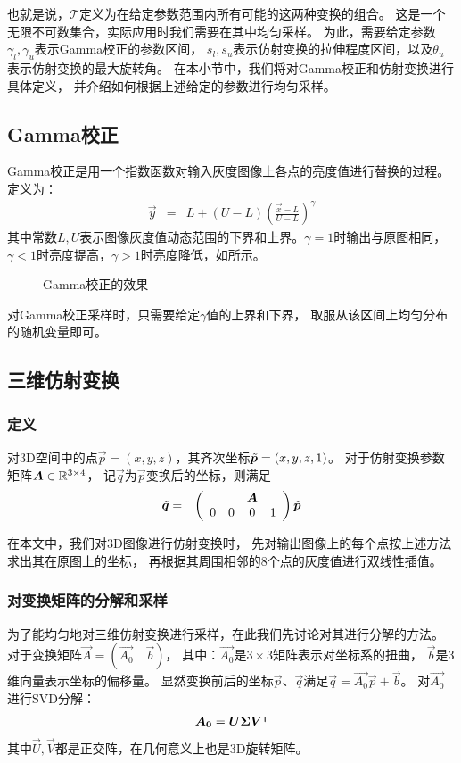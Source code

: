 也就是说，$\mathcal{T}$定义为在给定参数范围内所有可能的这两种变换的组合。
这是一个无限不可数集合，实际应用时我们需要在其中均匀采样。
为此，需要给定参数$\gamma_l, \gamma_u$表示Gamma校正的参数区间，
$s_l, s_u$表示仿射变换的拉伸程度区间，以及$\theta_u$表示仿射变换的最大旋转角。
在本小节中，我们将对Gamma校正和仿射变换进行具体定义，
并介绍如何根据上述给定的参数进行均匀采样。

\subsection{Gamma校正}
Gamma校正是用一个指数函数对输入灰度图像上各点的亮度值进行替换的过程。
定义为：
\begin{eqnarray}
    \vec{y} &=& L + (U-L)\left(\frac{\vec{x}-L}{U-L}\right)^\gamma
\end{eqnarray}
其中常数$L, U$表示图像灰度值动态范围的下界和上界。$\gamma=1$时输出与原图相同，
$\gamma < 1$时亮度提高，$\gamma > 1$时亮度降低，如所示。

\begin{figure}[H]
    \caption{Gamma校正的效果}
    \label{fig:cnn:aug:gamma}
\end{figure}

对Gamma校正采样时，只需要给定$\gamma$值的上界和下界，
取服从该区间上均匀分布的随机变量即可。

\subsection{三维仿射变换}

\subsubsection{定义}
对3D空间中的点$\vec{p} = (x, y, z)$，其齐次坐标$\tilde{\boldsymbol{p}}=(x, y, z, 1)$。
对于仿射变换参数矩阵$\boldsymbol{A} \in \mathbb{R}^{3\times 4}$，
记$\vec{q}$为$\vec{p}$变换后的坐标，则满足
\begin{eqnarray}
    \tilde{\boldsymbol{q}} &=& \left(\begin{array}{cccc}
        & & \boldsymbol{A} & \\
        0 & 0 & 0 & 1
    \end{array}\right)\tilde{\boldsymbol{p}}
\end{eqnarray}

在本文中，我们对3D图像进行仿射变换时，
先对输出图像上的每个点按上述方法求出其在原图上的坐标，
再根据其周围相邻的$8$个点的灰度值进行双线性插值。

\subsubsection{对变换矩阵的分解和采样}
为了能均匀地对三维仿射变换进行采样，在此我们先讨论对其进行分解的方法。
对于变换矩阵$\vec{A} = (\vec{A_0}\quad\vec{b})$，
其中：$\vec{A_0}$是$3\times 3$矩阵表示对坐标系的扭曲，
$\vec{b}$是3维向量表示坐标的偏移量。
显然变换前后的坐标$\vec{p}$、$\vec{q}$满足$\vec{q}=\vec{A_0}\vec{p}+\vec{b}$。
对$\vec{A_0}$进行SVD分解：
\begin{eqnarray}
    \boldsymbol{A_0} = \boldsymbol{U}\boldsymbol{\Sigma}\boldsymbol{V}^\intercal
\end{eqnarray}
其中$\vec{U}, \vec{V}$都是正交阵，在几何意义上也是3D旋转矩阵。

